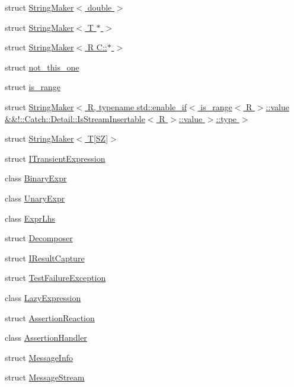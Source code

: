 \begin{DoxyCompactItemize}
\item 
struct \hyperlink{struct_catch_1_1_string_maker_3_01double_01_4}{String\-Maker$<$ double $>$}
\item 
struct \hyperlink{struct_catch_1_1_string_maker_3_01_t_01_5_01_4}{String\-Maker$<$ T $\ast$ $>$}
\item 
struct \hyperlink{struct_catch_1_1_string_maker_3_01_r_01_c_1_1_5_01_4}{String\-Maker$<$ R C\-::$\ast$ $>$}
\item 
struct \hyperlink{struct_catch_1_1not__this__one}{not\-\_\-this\-\_\-one}
\item 
struct \hyperlink{struct_catch_1_1is__range}{is\-\_\-range}
\item 
struct \hyperlink{struct_catch_1_1_string_maker_3_01_r_00_01typename_01std_1_1enable__if_3_01is__range_3_01_r_01_4536d8fedfff6d62432b3dc59b56e1380}{String\-Maker$<$ R, typename std\-::enable\-\_\-if$<$ is\-\_\-range$<$ R $>$\-::value \&\&!\-::\-Catch\-::\-Detail\-::\-Is\-Stream\-Insertable$<$ R $>$\-::value $>$\-::type $>$}
\item 
struct \hyperlink{struct_catch_1_1_string_maker_3_01_t[_s_z]_4}{String\-Maker$<$ T\mbox{[}\-S\-Z\mbox{]}$>$}
\item 
struct \hyperlink{struct_catch_1_1_i_transient_expression}{I\-Transient\-Expression}
\item 
class \hyperlink{class_catch_1_1_binary_expr}{Binary\-Expr}
\item 
class \hyperlink{class_catch_1_1_unary_expr}{Unary\-Expr}
\item 
class \hyperlink{class_catch_1_1_expr_lhs}{Expr\-Lhs}
\item 
struct \hyperlink{struct_catch_1_1_decomposer}{Decomposer}
\item 
struct \hyperlink{struct_catch_1_1_i_result_capture}{I\-Result\-Capture}
\item 
struct \hyperlink{struct_catch_1_1_test_failure_exception}{Test\-Failure\-Exception}
\item 
class \hyperlink{class_catch_1_1_lazy_expression}{Lazy\-Expression}
\item 
struct \hyperlink{struct_catch_1_1_assertion_reaction}{Assertion\-Reaction}
\item 
class \hyperlink{class_catch_1_1_assertion_handler}{Assertion\-Handler}
\item 
struct \hyperlink{struct_catch_1_1_message_info}{Message\-Info}
\item 
struct \hyperlink{struct_catch_1_1_message_stream}{Message\-Stream}
\item 

\end{DoxyCompactItemize}
